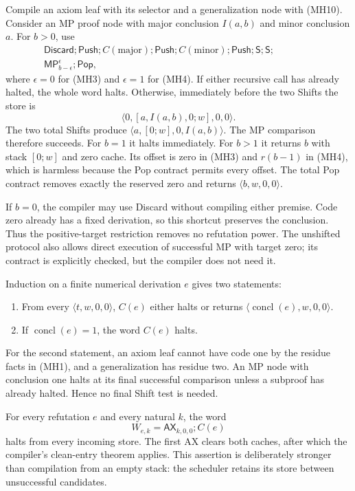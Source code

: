 Compile an axiom leaf with its selector and a generalization node with
(MH10). Consider an MP proof node with major conclusion $I(a,b)$ and
minor conclusion $a$. For $b>0$, use
\[
 \begin{split}
 \mathsf{Discard};\mathsf{Push};C(\text{major});\mathsf{Push};
 C(\text{minor});\mathsf{Push};\mathsf S;\mathsf S;\qquad\qquad\\[-2pt]
 \mathsf{MP}^{\epsilon}_{b-\epsilon};\mathsf{Pop},
 \end{split}
 \tag{MH11}
\]
where $\epsilon=0$ for (MH3) and $\epsilon=1$ for (MH4).
If either recursive call has already halted, the whole word halts.
Otherwise, immediately before the two Shifts the store is
\[
       \langle0,[a,I(a,b),0;w],0,0\rangle.
\]
The two total Shifts produce
$\langle a,[0;w],0,I(a,b)\rangle$. The MP comparison therefore succeeds.
For $b=1$ it halts immediately. For $b>1$ it returns $b$ with stack
$[0;w]$ and zero cache. Its offset is zero in (MH3) and $r(b-1)$ in
(MH4), which is harmless because the Pop contract permits every offset.
The total Pop contract removes exactly the reserved zero and returns
$\langle b,w,0,0\rangle$.

If $b=0$, the compiler may use Discard without compiling either premise.
Code zero already has a fixed derivation, so this shortcut preserves the
conclusion. Thus the positive-target restriction removes no refutation
power. The unshifted protocol also allows direct execution of successful
MP with target zero; its contract is explicitly checked, but the compiler
does not need it.

Induction on a finite numerical derivation $e$ gives two statements:
\begin{enumerate}
\item From every $\langle t,w,0,0\rangle$, $C(e)$ either halts or returns
      $\langle\operatorname{concl}(e),w,0,0\rangle$.
\item If $\operatorname{concl}(e)=1$, the word $C(e)$ halts.
\end{enumerate}
For the second statement, an axiom leaf cannot have code one by the
residue facts in (MH1), and a generalization has residue two. An MP node
with conclusion one halts at its final successful comparison unless a
subproof has already halted. Hence no final Shift test is needed.

For every refutation $e$ and every natural $k$, the word
\[
        W_{e,k}=\mathsf{AX}_{k,0,0};C(e)
 \tag{MH12}
\]
halts from every incoming store. The first AX clears both caches, after
which the compiler's clean-entry theorem applies. This assertion is
deliberately stronger than compilation from an empty stack: the scheduler
retains its store between unsuccessful candidates.

